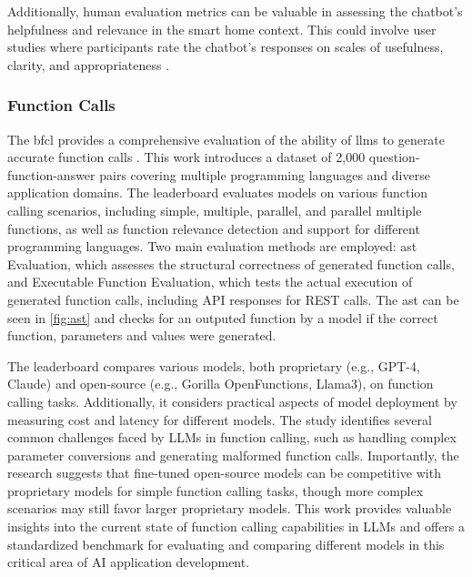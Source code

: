 Additionally, human evaluation metrics can be valuable in assessing the chatbot's helpfulness and relevance in the smart home context. This could involve user studies where participants rate the chatbot's responses on scales of usefulness, clarity, and appropriateness \cite{guo2023evaluatinglargelanguagemodels}.

\subsubsection{Function Calls}
The \gls{bfcl} provides a comprehensive evaluation of the ability of \glspl{llm} to generate accurate function calls \cite{berkeley-function-calling-leaderboard}. 
This work introduces a dataset of 2,000 question-function-answer pairs covering multiple programming languages and diverse application domains. 
The leaderboard evaluates models on various function calling scenarios, including simple, multiple, parallel, and parallel multiple functions, as well as function relevance detection and support for different programming languages. 
Two main evaluation methods are employed: \gls{ast} Evaluation, which assesses the structural correctness of generated function calls, and Executable Function Evaluation, which tests the actual execution of generated function calls, including API responses for REST calls.
The \gls{ast} can be seen in \cref{fig:ast} and checks for an outputed function by a model if the correct function, parameters and values were generated.

The leaderboard compares various models, both proprietary (e.g., GPT-4, Claude) and open-source (e.g., Gorilla OpenFunctions, Llama3), on function calling tasks. 
Additionally, it considers practical aspects of model deployment by measuring cost and latency for different models. 
The study identifies several common challenges faced by LLMs in function calling, such as handling complex parameter conversions and generating malformed function calls. 
Importantly, the research suggests that fine-tuned open-source models can be competitive with proprietary models for simple function calling tasks, though more complex scenarios may still favor larger proprietary models. 
This work provides valuable insights into the current state of function calling capabilities in LLMs and offers a standardized benchmark for evaluating and comparing different models in this critical area of AI application development.

